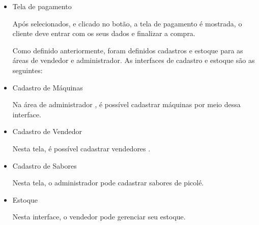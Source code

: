 \begin{itemize}
\item{Tela de pagamento}


Após selecionados, e clicado no botão, a tela de pagamento é mostrada, o cliente deve entrar com os seus dados e finalizar a compra.

Como definido anteriormente, foram definidos cadastros e estoque para as áreas de vendedor e administrador. As interfaces de cadastro e estoque são as seguintes: 

\item{Cadastro de Máquinas}


Na área de administrador , é possível cadastrar máquinas por meio dessa interface.

\item{Cadastro de Vendedor}


Nesta tela, é possível cadastrar vendedores .

\item{Cadastro de Sabores}


Nesta tela, o administrador pode cadastrar sabores de picolé.

\item{Estoque}


Nesta interface, o vendedor pode gerenciar seu estoque.

\end{itemize}


